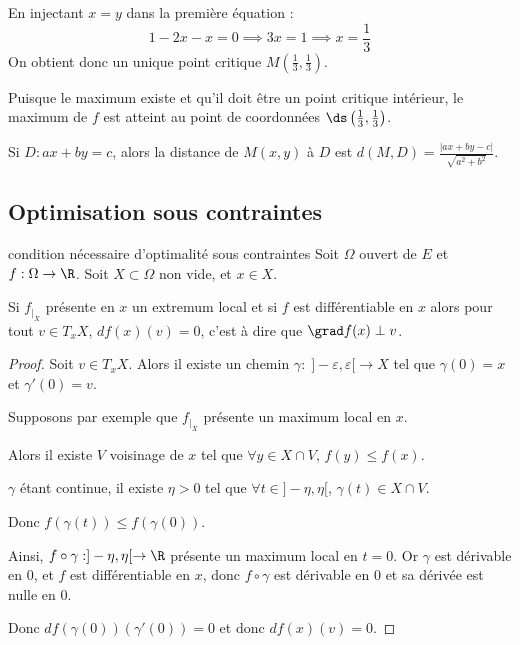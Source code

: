 \begin{exemple}
    En injectant $x=y$ dans la première équation :
    \[
    1 - 2x - x = 0 \implies 3x = 1 \implies x = \frac{1}{3}
    \]
    On obtient donc un unique point critique $M(\frac{1}{3}, \frac{1}{3})$.


    \svspace Puisque le maximum existe et qu'il doit être un point critique intérieur, le maximum de $f$ est atteint au point de coordonnées $\ds \left(\frac{1}{3}, \frac{1}{3}\right)$.
\end{exemple}


\begin{remarque}
    Si $D : ax + by = c$, alors la distance de $M(x, y)$ à $D$ est 
    $\displaystyle d(M, D) = \frac{|ax + by - c|}{\sqrt{a^2 + b^2}}$.
\end{remarque}


\subsection{Optimisation sous contraintes}


\lvspace
\avspace

\begin{propositionnt}{condition nécessaire d'optimalité sous contraintes}{}
    Soit $\Omega$ ouvert de $E$ et $f : \Omega \to \R$. Soit $X \subset \Omega$ non vide, et 
    $x \in X$. 

    Si $f_{|_X}$ présente en $x$ un extremum local et si $f$ est différentiable en $x$ alors 
    pour tout $v \in T_xX$, $df(x)(v) = 0$, c'est à dire que $\grad f(x) \perp v$. 
\end{propositionnt}


\begin{proof}
    Soit $v \in T_xX$. Alors il existe un chemin $\gamma : \; ]-\varepsilon, \varepsilon[ \to X$
    tel que $\gamma(0) = x$ et $\gamma'(0) = v$.

    Supposons par exemple que $f_{|_X}$ présente un maximum local en $x$.

    Alors il existe $V$ voisinage de $x$ tel que $\forall y \in X \cap V$, $f(y) \leqslant f(x)$.

    $\gamma$ étant continue, il existe $\eta > 0$ tel que $\forall t \in ]-\eta, \eta[$, $\gamma(t) \in X \cap V$.

    Donc $f(\gamma(t)) \leqslant f(\gamma(0))$.

    Ainsi, $f \circ \gamma : ]-\eta, \eta[ \to \R$ présente un maximum local en $t = 0$.
    Or $\gamma$ est dérivable en $0$, et $f$ est différentiable en $x$, donc 
    $f \circ \gamma$ est dérivable en $0$ et sa dérivée est nulle en $0$.

    Donc $df(\gamma(0))(\gamma'(0)) = 0$ et donc $df(x)(v) = 0$.
\end{proof}

